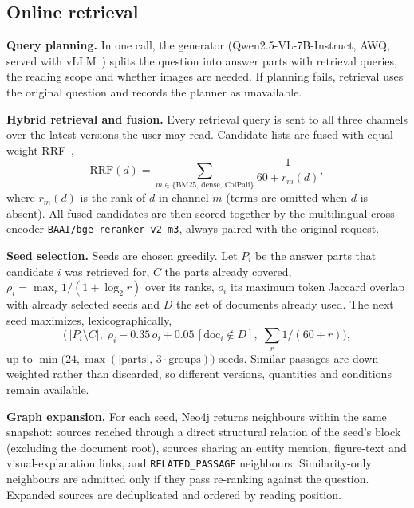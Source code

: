 \documentclass[conference]{IEEEtran}
\begin{document}
\subsection{Online retrieval}
\textbf{Query planning.} In one call, the generator (Qwen2.5-VL-7B-Instruct, AWQ, served with vLLM~\cite{bai2025qwen25vl,kwon2023vllm}) splits the question into answer parts with retrieval queries, the reading scope and whether images are needed. If planning fails, retrieval uses the original question and records the planner as unavailable.

\textbf{Hybrid retrieval and fusion.} Every retrieval query is sent to all three channels over the latest versions the user may read. Candidate lists are fused with equal-weight RRF~\cite{cormack2009rrf},
\begin{equation}
\mathrm{RRF}(d)=\sum_{m\in\{\mathrm{BM25},\,\mathrm{dense},\,\mathrm{ColPali}\}}\frac{1}{60+r_m(d)},
\end{equation}
where $r_m(d)$ is the rank of $d$ in channel $m$ (terms are omitted when $d$ is absent). All fused candidates are then scored together by the multilingual cross-encoder \texttt{BAAI/bge-reranker-v2-m3}, always paired with the original request.

\textbf{Seed selection.} Seeds are chosen greedily. Let $P_i$ be the answer parts that candidate $i$ was retrieved for, $C$ the parts already covered, $\rho_i=\max_r 1/(1+\log_2 r)$ over its ranks, $o_i$ its maximum token Jaccard overlap with already selected seeds and $D$ the set of documents already used. The next seed maximizes, lexicographically,
\begin{equation}
\bigl(\,|P_i\setminus C|,\;\rho_i-0.35\,o_i+0.05\,[\mathrm{doc}_i\notin D],\;\textstyle\sum_r 1/(60+r)\bigr),
\end{equation}
up to $\min\!\bigl(24,\max(|\text{parts}|,\,3\cdot\text{groups})\bigr)$ seeds. Similar passages are down-weighted rather than discarded, so different versions, quantities and conditions remain available.

\textbf{Graph expansion.} For each seed, Neo4j returns neighbours within the same snapshot: sources reached through a direct structural relation of the seed's block (excluding the document root), sources sharing an entity mention, figure-text and visual-explanation links, and \texttt{RELATED\_PASSAGE} neighbours. Similarity-only neighbours are admitted only if they pass re-ranking against the question. Expanded sources are deduplicated and ordered by reading position.
\end{document}
